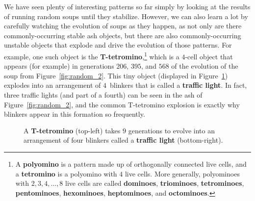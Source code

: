 We have seen plenty of interesting patterns so far simply by looking at the results of running random soups until they stabilize. However, we can also learn a lot by carefully watching the evolution of soups as they happen, as not only are there commonly-occurring stable ash objects, but there are also commonly-occurring unstable objects that explode and drive the evolution of those patterns. For example, one such object is the \textbf{T-tetromino},\footnote{A \textbf{polyomino} is a pattern made up of orthogonally connected live cells, and a \textbf{tetromino} is a polyomino with $4$ live cells. More generally, polyominoes with $2, 3, 4, \ldots, 8$ live cells are called \textbf{dominoes}, \textbf{triominoes}, \textbf{tetrominoes}, \textbf{pentominoes}, \textbf{hexominoes}, \textbf{heptominoes}, and \textbf{octominoes}.} which is a $4$-cell object that appears (for example) in generations $206$, $395$, and $568$ of the evolution of the soup from Figure~\ref{fig:random_2}. This tiny object (displayed in Figure~\ref{fig:t_tetromino}) explodes into an arrangement of $4$~blinkers that is called a \textbf{traffic light}. In fact, three traffic lights (and part of a fourth) can be seen in the ash of Figure~\ref{fig:random_2}, and the common T-tetromino explosion is exactly why blinkers appear in this formation so frequently.

\begin{figure}[!htb]
	\centering
	\caption{A \textbf{T-tetromino} (top-left) takes $9$ generations to evolve into an arrangement of four blinkers called a \textbf{traffic light} (bottom-right).}\label{fig:t_tetromino}
\end{figure}

